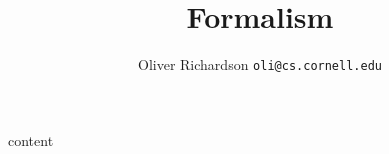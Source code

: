 \documentclass{article}
\title{Formalism}
\author{Oliver Richardson  \texttt{oli@cs.cornell.edu}}
\begin{document}
	content
\end{document}
